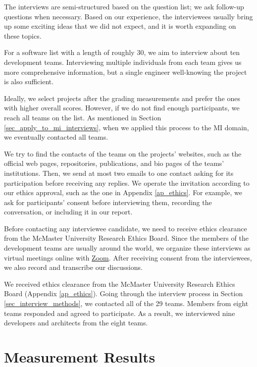 \documentclass[3p, 12pt,authoryear]{elsarticle}
\begin{document}
The interviews are semi-structured based on the question list; we ask follow-up
questions when necessary. Based on our experience, the interviewees usually
bring up some exciting ideas that we did not expect, and it is worth expanding
on these topics.

For a software list with a length of roughly 30, we aim to interview about ten
development teams. Interviewing multiple individuals from each team gives us
more comprehensive information, but a single engineer well-knowing the project
is also sufficient.

Ideally, we select projects after the grading measurements and prefer the ones
with higher overall scores. However, if we do not find enough participants, we
reach all teams on the list. As mentioned in Section
\ref{sec_apply_to_mi_interviews}, when we applied this process to the MI domain,
we eventually contacted all teams.

We try to find the contacts of the teams on the projects' websites, such as the
official web pages, repositories, publications, and bio pages of the teams'
institutions. Then, we send at most two emails to one contact asking for its
participation before receiving any replies. We operate the invitation according
to our ethics approval, such as the one in Appendix \ref{ap_ethics}. For
example, we ask for participants' consent before interviewing them, recording
the conversation, or including it in our report.

Before contacting any interviewee candidate, we need to receive ethics clearance
from the McMaster University Research Ethics Board. Since the members of the
development teams are usually around the world, we organize these interviews as
virtual meetings online with \hyperlink{https://zoom.us/}{Zoom}. After receiving
consent from the interviewees, we also record and transcribe our discussions.

We received ethics clearance from the McMaster University Research Ethics Board
(Appendix \ref{ap_ethics}). Going through the interview process in Section
\ref{sec_interview_methods}, we contacted all of the 29 teams. Members from
eight teams responded and agreed to participate. As a result, we interviewed
nine developers and architects from the eight teams.

\section{Measurement Results} \label{ch_results}
\end{document}
